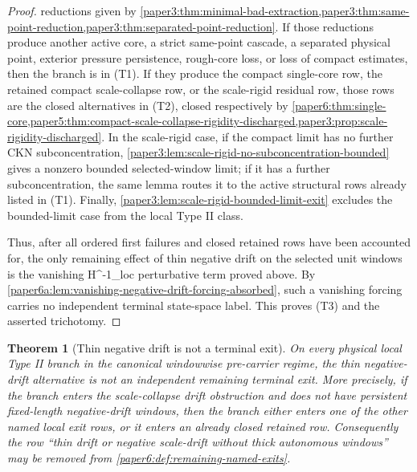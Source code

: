 \documentclass[11pt]{amsart}
\def\({}%
\def\){}%
\theoremstyle{plain}
\newtheorem{theorem}{Theorem}[section]
\theoremstyle{definition}
\theoremstyle{remark}
\begin{document}
\begin{proof}
reductions given by
\cref{paper3:thm:minimal-bad-extraction,paper3:thm:same-point-reduction,paper3:thm:separated-point-reduction}.
If those reductions produce another active core, a strict same-point cascade,
a separated physical point, exterior pressure persistence, rough-core loss, or
loss of compact estimates, then the branch is in \textup{(T1)}.  If they
produce the compact single-core row, the retained compact scale-collapse row,
or the scale-rigid residual row, those rows are the closed alternatives in
\textup{(T2)}, closed respectively by
\cref{paper6:thm:single-core,paper5:thm:compact-scale-collapse-rigidity-discharged,paper3:prop:scale-rigidity-discharged}.
In the scale-rigid case, if the compact limit has no further CKN
subconcentration, \cref{paper3:lem:scale-rigid-no-subconcentration-bounded}
gives a nonzero bounded selected-window limit; if it has a further
subconcentration, the same lemma routes it to the active structural rows
already listed in \textup{(T1)}.  Finally,
\cref{paper3:lem:scale-rigid-bounded-limit-exit} excludes the bounded-limit
case from the local Type II class.
\par
Thus, after all ordered first failures and closed retained rows have been
accounted for, the only remaining effect of thin negative drift on the
selected unit windows is the vanishing \(H^{-1}_{\rm loc}\) perturbative term
proved above.  By
\cref{paper6a:lem:vanishing-negative-drift-forcing-absorbed}, such a vanishing
forcing carries no independent terminal state-space label.  This proves
\textup{(T3)} and the asserted trichotomy.
\end{proof}

\begin{theorem}[Thin negative drift is not a terminal exit]
\label{paper6a:thm:thin-negative-drift-closed}
On every physical local Type II branch in the canonical windowwise
pre-carrier regime, the thin negative-drift alternative is not an independent
remaining terminal exit.  More precisely, if the branch enters the
scale-collapse drift obstruction and does not have persistent fixed-length
negative-drift windows, then the branch either enters one of the other named
local exit rows, or it enters an already closed retained row.  Consequently
the row ``thin drift or negative scale-drift without thick autonomous
windows'' may be removed from
\cref{paper6:def:remaining-named-exits}.
\end{theorem}
\end{document}
